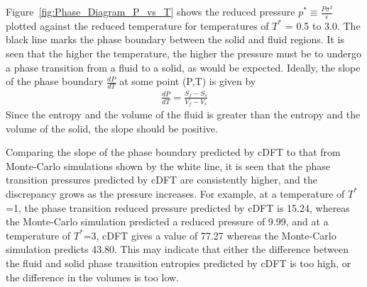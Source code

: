 \documentclass[double,12pt]{beavtex}
\begin{document}
Figure~\ref{fig:Phase_Diagram_P_vs_T} shows the reduced pressure 
$p^*\equiv\frac{P\sigma^3}{\epsilon}$ plotted against the reduced temperature 
for temperatures of $T^*$ = 0.5 to 3.0. 
The black line marks the phase boundary between the solid and fluid regions. 
It is seen that the higher the temperature, the higher the pressure must be
to undergo a phase transition from a fluid to a solid, as would be expected. 
Ideally, the slope of the phase boundary $\frac{dP}{dT}$ at some point (P,T) 
is given by
\begin{align} 
    \frac{dP}{dT}=\frac{S_f-S_s}{V_f-V_s}
\end{align}
Since the entropy and the volume of the fluid is greater than the entropy
and the volume of the solid, the slope should be positive. 

Comparing the slope of the phase boundary predicted by cDFT to that
from Monte-Carlo simulations shown by the white line, it is seen that
the phase transition pressures predicted by cDFT 
are consistently higher, and the 
discrepancy grows as the pressure increases. For example, at a 
temperature of $T^*$=1, the phase transition reduced pressure predicted by 
cDFT is 15.24, whereas the Monte-Carlo simulation predicted a reduced 
pressure of 9.99,
and at a temperature of $T^*$=3, cDFT gives a value of 77.27 whereas the 
Monte-Carlo simulation predicts 43.80.
This may indicate that either the difference between the fluid 
and solid phase transition entropies predicted by cDFT is too high, or 
the difference in the volumes is too low. 
\end{document}
